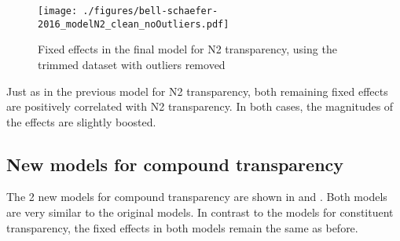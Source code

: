 \begin{figure}[htb]
  \centering
\texttt{[image: ./figures/bell-schaefer-2016\_modelN2\_clean\_noOutliers.pdf]}
  \caption{Fixed effects in the final model for N2 transparency, using the trimmed dataset with outliers removed}
\label{fig:bs2016_N2_final}
\end{figure}

Just as in the previous model for N2 transparency, both remaining
fixed effects are positively correlated with N2 transparency. In both
cases, the magnitudes of the effects are slightly boosted.

\subsection{New models for compound transparency}
\label{sec:new-compound-transparency}

The 2 new models for compound transparency are shown in 
and . Both models are
very similar to the original models.
In contrast to the models for constituent transparency, the fixed
effects in both models remain the same as before.

